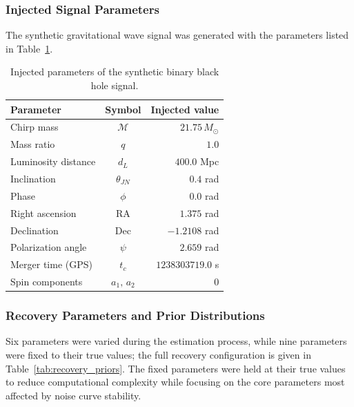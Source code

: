 \documentclass[12pt]{article}
\begin{document}
\subsubsection{Injected Signal Parameters}
The synthetic gravitational wave signal was generated with the parameters listed in Table~\ref{tab:injected_params}.

\begin{table}[ht]
\centering
\caption{Injected parameters of the synthetic binary black hole signal.}
\label{tab:injected_params}
\begin{tabular}{|l|c|r|}
\hline
\textbf{Parameter} & \textbf{Symbol} & \textbf{Injected value} \\
\hline
Chirp mass & $\mathcal{M}$ & $21.75\,M_\odot$ \\
Mass ratio & $q$ & $1.0$ \\
Luminosity distance & $d_L$ & $400.0$ Mpc \\
Inclination & $\theta_{JN}$ & $0.4$ rad \\
Phase & $\phi$ & $0.0$ rad \\
Right ascension & RA & $1.375$ rad \\
Declination & Dec & $-1.2108$ rad \\
Polarization angle & $\psi$ & $2.659$ rad \\
Merger time (GPS) & $t_c$ & $1238303719.0$ s \\
Spin components & $a_1,\,a_2$ & $0$ \\
\hline
\end{tabular}
\end{table}

\subsubsection{Recovery Parameters and Prior Distributions}
Six parameters were varied during the estimation process, while nine parameters were fixed to their true values; the full recovery configuration is given in Table~\ref{tab:recovery_priors}. The fixed parameters were held at their true values to reduce computational complexity while focusing on the core parameters most affected by noise curve stability.
\end{document}

